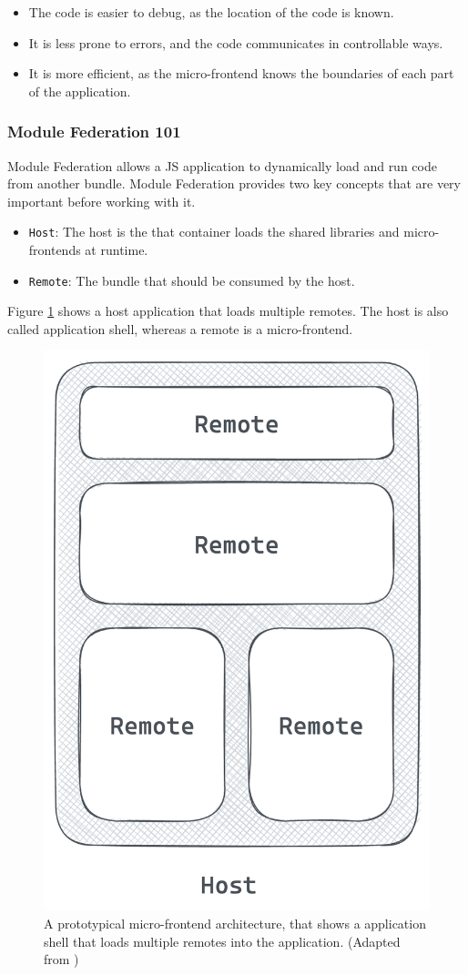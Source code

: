 \begin{itemize}
  \item The code is easier to debug, as the location of the code is known.
  \item It is less prone to errors, and the code communicates in controllable ways.
  \item It is more efficient, as the micro-frontend knows the boundaries of each part of the application.
\end{itemize}

\subsubsection{Module Federation 101}\label{subsubsection:background:micro-frontend:module-federation:101}

Module Federation allows a \ac{JS} application to dynamically load and run code from another bundle. Module Federation provides two key concepts that are very important before working with it. \cite[118-119]{book:2021:mezzalira:applied-methods:building-micro-frontends}

\begin{itemize}
    \item \texttt{Host}: The host is the that container loads the shared libraries and micro-frontends at runtime.
    \item \texttt{Remote}: The bundle that should be consumed by the host.
\end{itemize}

\noindent Figure \ref{fig:background:micro-frontend:module-federation:module-federation-architecture} shows a host application that loads multiple remotes. The host is also called application shell, whereas a remote is a micro-frontend.

\ifshowImages
\begin{figure}[H]
  \centering
  \includegraphics[width=0.3\linewidth]{images/background/micro-frontends/module-federation/module-federation-architecture.png}
  \caption{A prototypical micro-frontend architecture, that shows a application shell that loads multiple remotes into the application. (Adapted from \cite[119]{book:2021:mezzalira:applied-methods:building-micro-frontends})}\label{fig:background:micro-frontend:module-federation:module-federation-architecture}
\end{figure}
\fi

